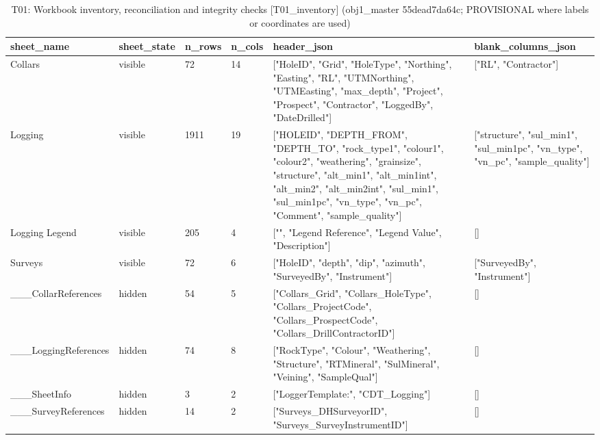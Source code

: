 \begin{table}[htbp]
\centering
\caption{T01: Workbook inventory, reconciliation and integrity checks [T01\_inventory] (obj1\_master 55dead7da64c; PROVISIONAL where labels or coordinates are used)}
\begin{tabular}{llllll}
\toprule
sheet\_name & sheet\_state & n\_rows & n\_cols & header\_json & blank\_columns\_json \\
\midrule
Collars & visible & 72 & 14 & ["HoleID", "Grid", "HoleType", "Northing", "Easting", "RL", "UTMNorthing", "UTMEasting", "max\_depth", "Project", "Prospect", "Contractor", "LoggedBy", "DateDrilled"] & ["RL", "Contractor"] \\
Logging & visible & 1911 & 19 & ["HOLEID", "DEPTH\_FROM", "DEPTH\_TO", "rock\_type1", "colour1", "colour2", "weathering", "grainsize", "structure", "alt\_min1", "alt\_min1int", "alt\_min2", "alt\_min2int", "sul\_min1", "sul\_min1pc", "vn\_type", "vn\_pc", "Comment", "sample\_quality"] & ["structure", "sul\_min1", "sul\_min1pc", "vn\_type", "vn\_pc", "sample\_quality"] \\
Logging Legend & visible & 205 & 4 & ["", "Legend Reference", "Legend Value", "Description"] & [] \\
Surveys & visible & 72 & 6 & ["HoleID", "depth", "dip", "azimuth", "SurveyedBy", "Instrument"] & ["SurveyedBy", "Instrument"] \\
\_\_\_CollarReferences & hidden & 54 & 5 & ["Collars\_Grid", "Collars\_HoleType", "Collars\_ProjectCode", "Collars\_ProspectCode", "Collars\_DrillContractorID"] & [] \\
\_\_\_LoggingReferences & hidden & 74 & 8 & ["RockType", "Colour", "Weathering", "Structure", "RTMineral", "SulMineral", "Veining", "SampleQual"] & [] \\
\_\_\_SheetInfo & hidden & 3 & 2 & ["LoggerTemplate:", "CDT\_Logging"] & [] \\
\_\_\_SurveyReferences & hidden & 14 & 2 & ["Surveys\_DHSurveyorID", "Surveys\_SurveyInstrumentID"] & [] \\
\bottomrule
\end{tabular}
\end{table}
